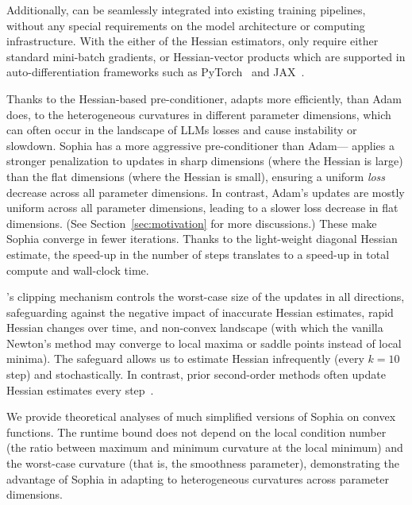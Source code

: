 Additionally, {\ours} can be seamlessly integrated into existing training pipelines, without any special requirements on the model architecture or computing infrastructure. With the either of the Hessian estimators, {\ours} only require either standard mini-batch gradients, or Hessian-vector products which are supported in auto-differentiation frameworks such as PyTorch~\citep{pytorch2019} and JAX~\citep{jax2018github}. 


Thanks to the Hessian-based pre-conditioner, {\ours} adapts more efficiently, than Adam does, to the heterogeneous curvatures in different parameter dimensions, which can often occur in the landscape of LLMs losses and cause instability or slowdown. 
Sophia has a more aggressive pre-conditioner than Adam---{\ours} applies a stronger penalization to updates in sharp dimensions (where the Hessian is large) than the flat dimensions (where the Hessian is small), ensuring a uniform \textit{loss} decrease across all parameter dimensions. In contrast, Adam's updates are mostly uniform across all parameter dimensions, leading to a slower loss decrease in flat dimensions. (See Section~\ref{sec:motivation} for more discussions.) 
These make Sophia converge in fewer iterations. Thanks to the light-weight diagonal Hessian estimate, the speed-up in the number of steps translates to a speed-up in total compute and wall-clock time. 



\ours's clipping mechanism controls the worst-case size of the updates in all directions, safeguarding against the negative impact of inaccurate Hessian estimates, rapid Hessian changes over time, and non-convex landscape (with which the vanilla Newton’s method may converge to local maxima or saddle points instead of local minima). The safeguard allows us to estimate Hessian infrequently (every $k=10$ step) and stochastically. In contrast, prior second-order methods often update Hessian estimates every step~\citep{martens2015optimizing,grosse2016kronecker,  anil2020scalable,yao2021adahessian}. 


We provide theoretical analyses of much simplified versions of Sophia on convex functions. 
The runtime bound does not depend on the local condition number (the ratio between maximum and minimum curvature at the local minimum) and the worst-case curvature (that is, the smoothness parameter), demonstrating the advantage of Sophia in adapting to heterogeneous curvatures across parameter dimensions. 